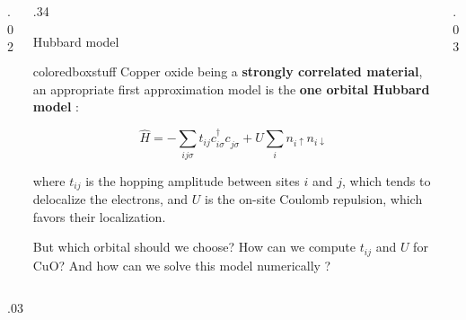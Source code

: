 \documentclass[final, hyperref={pdfpagelabels=false}]{beamer}
\begin{document}
\begin{frame}[t]
\begin{columns}[t]
\begin{column}{.02\textwidth}
\end{column}	%
\begin{column}{.34\textwidth}
\begin{block}{\color{ta2orange!0} Hubbard model}
\begin{beamercolorbox}[wd=\textwidth]{coloredboxstuff}
Copper oxide being a \textbf{strongly correlated material}, an appropriate first approximation model is the \textbf{one orbital Hubbard model} :

\vspace{0.1em}
\begin{equation*}
\hat{H} = -\sum_{ij\sigma} t_{ij} c_{i\sigma}^{\dagger}c_{j\sigma}^{\phantom{\dagger}} + U \sum_{i} n_{i\uparrow} n_{i\downarrow}
\end{equation*}
\vspace{0.1em}

where $t_{ij}$ is the hopping amplitude between sites $i$ and $j$, which tends to delocalize the electrons, and $U$ is the on-site Coulomb repulsion, which favors their localization.

\vspace{1.1em}

But which orbital should we choose? How can we compute $t_{ij}$ and $U$ for CuO? And how can we solve this model numerically ?
\end{beamercolorbox}
\end{block}
\end{column}

\begin{column}{.03\textwidth}
\end{column} %

\end{columns} %
\vspace{-0.75em}




\begin{columns}[t] %

\begin{column}{.03\textwidth}
\end{column} %


\end{columns}
\end{frame}
\end{document}
